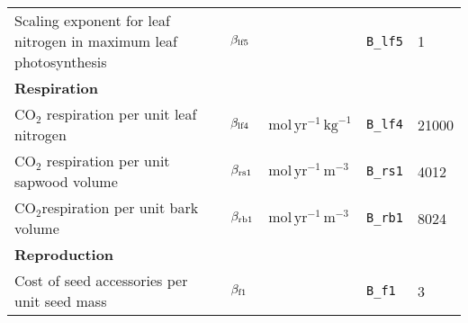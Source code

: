 \begin{tabular}{p{7cm}llll}
  Scaling exponent for leaf nitrogen in maximum leaf photosynthesis & $\beta_{\rm lf5}$ &  & \texttt{B\_lf5} & 1 \\ 
  \textbf{Respiration} &  &  &  &  \\ 
  CO$_2$ respiration per unit leaf nitrogen & $\beta_{\rm lf4}$ & $\mathrm{mol}\,\mathrm{yr}^{-1}\,\mathrm{kg}^{-1}$ & \texttt{B\_lf4} & 21000 \\ 
  CO$_2$ respiration per unit sapwood volume & $\beta_{\rm rs1}$ & $\mathrm{mol}\,\mathrm{yr}^{-1}\,\mathrm{m}^{-3}$ & \texttt{B\_rs1} & 4012 \\ 
  CO$_2$respiration per unit bark volume & $\beta_{\rm rb1}$ & $\mathrm{mol}\,\mathrm{yr}^{-1}\,\mathrm{m}^{-3}$ & \texttt{B\_rb1} & 8024 \\ 
  \textbf{Reproduction} &  &  &  &  \\ 
  Cost of seed accessories per unit seed mass & $\beta_{\rm f1}$ &  & \texttt{B\_f1} & 3 \\ 
   \hline
\end{tabular}
